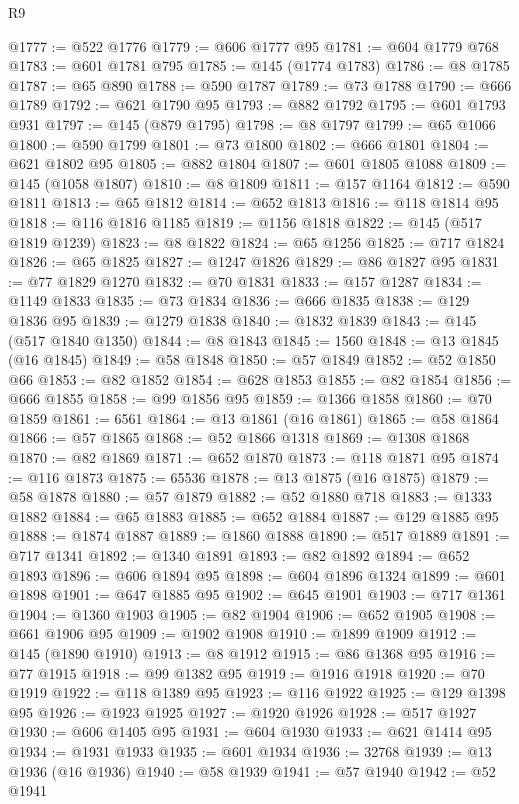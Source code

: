 \begin{lexlean}{R9}
\begin{coremodule}
@1777 := @522 @1776
@1779 := @606 @1777 @95
@1781 := @604 @1779 @768
@1783 := @601 @1781 @795
@1785 := @145 (@1774 @1783)
@1786 := @8 @1785
@1787 := @65 @890
@1788 := @590 @1787
@1789 := @73 @1788
@1790 := @666 @1789
@1792 := @621 @1790 @95
@1793 := @882 @1792
@1795 := @601 @1793 @931
@1797 := @145 (@879 @1795)
@1798 := @8 @1797
@1799 := @65 @1066
@1800 := @590 @1799
@1801 := @73 @1800
@1802 := @666 @1801
@1804 := @621 @1802 @95
@1805 := @882 @1804
@1807 := @601 @1805 @1088
@1809 := @145 (@1058 @1807)
@1810 := @8 @1809
@1811 := @157 @1164
@1812 := @590 @1811
@1813 := @65 @1812
@1814 := @652 @1813
@1816 := @118 @1814 @95
@1818 := @116 @1816 @1185
@1819 := @1156 @1818
@1822 := @145 (@517 @1819 @1239)
@1823 := @8 @1822
@1824 := @65 @1256
@1825 := @717 @1824
@1826 := @65 @1825
@1827 := @1247 @1826
@1829 := @86 @1827 @95
@1831 := @77 @1829 @1270
@1832 := @70 @1831
@1833 := @157 @1287
@1834 := @1149 @1833
@1835 := @73 @1834
@1836 := @666 @1835
@1838 := @129 @1836 @95
@1839 := @1279 @1838
@1840 := @1832 @1839
@1843 := @145 (@517 @1840 @1350)
@1844 := @8 @1843
@1845 := 1560
@1848 := @13 @1845 (@16 @1845)
@1849 := @58 @1848
@1850 := @57 @1849
@1852 := @52 @1850 @66
@1853 := @82 @1852
@1854 := @628 @1853
@1855 := @82 @1854
@1856 := @666 @1855
@1858 := @99 @1856 @95
@1859 := @1366 @1858
@1860 := @70 @1859
@1861 := 6561
@1864 := @13 @1861 (@16 @1861)
@1865 := @58 @1864
@1866 := @57 @1865
@1868 := @52 @1866 @1318
@1869 := @1308 @1868
@1870 := @82 @1869
@1871 := @652 @1870
@1873 := @118 @1871 @95
@1874 := @116 @1873
@1875 := 65536
@1878 := @13 @1875 (@16 @1875)
@1879 := @58 @1878
@1880 := @57 @1879
@1882 := @52 @1880 @718
@1883 := @1333 @1882
@1884 := @65 @1883
@1885 := @652 @1884
@1887 := @129 @1885 @95
@1888 := @1874 @1887
@1889 := @1860 @1888
@1890 := @517 @1889
@1891 := @717 @1341
@1892 := @1340 @1891
@1893 := @82 @1892
@1894 := @652 @1893
@1896 := @606 @1894 @95
@1898 := @604 @1896 @1324
@1899 := @601 @1898
@1901 := @647 @1885 @95
@1902 := @645 @1901
@1903 := @717 @1361
@1904 := @1360 @1903
@1905 := @82 @1904
@1906 := @652 @1905
@1908 := @661 @1906 @95
@1909 := @1902 @1908
@1910 := @1899 @1909
@1912 := @145 (@1890 @1910)
@1913 := @8 @1912
@1915 := @86 @1368 @95
@1916 := @77 @1915
@1918 := @99 @1382 @95
@1919 := @1916 @1918
@1920 := @70 @1919
@1922 := @118 @1389 @95
@1923 := @116 @1922
@1925 := @129 @1398 @95
@1926 := @1923 @1925
@1927 := @1920 @1926
@1928 := @517 @1927
@1930 := @606 @1405 @95
@1931 := @604 @1930
@1933 := @621 @1414 @95
@1934 := @1931 @1933
@1935 := @601 @1934
@1936 := 32768
@1939 := @13 @1936 (@16 @1936)
@1940 := @58 @1939
@1941 := @57 @1940
@1942 := @52 @1941

\end{coremodule}
\end{lexlean}
